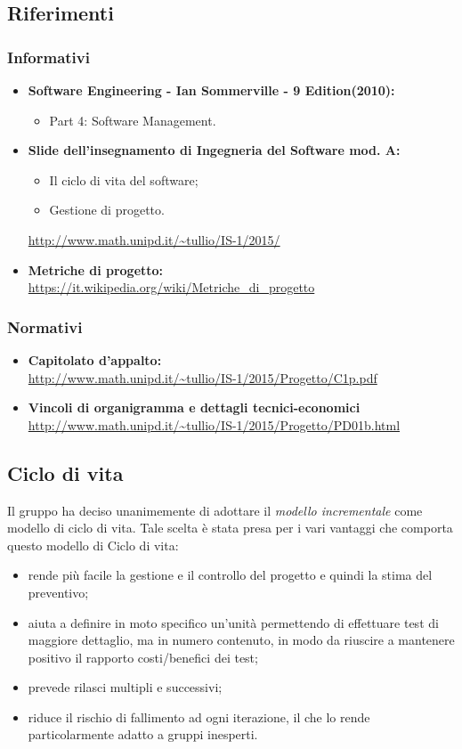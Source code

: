 \documentclass[a4paper]{article}
\begin{document}
		\subsection{Riferimenti}
			\subsubsection{Informativi}
				\begin{itemize}
					\item \textbf{Software Engineering - Ian Sommerville - 9 Edition(2010):}
					\begin{itemize}
						\item Part 4: Software Management.
					\end{itemize}
					\item \textbf{Slide dell'insegnamento di Ingegneria del Software mod. A:}
					\begin{itemize}
						\item Il ciclo di vita del software;
						\item Gestione di progetto.
					\end{itemize}
					\url{http://www.math.unipd.it/~tullio/IS-1/2015/}
					\item \textbf{Metriche di progetto:} \\
					\url{https://it.wikipedia.org/wiki/Metriche_di_progetto}
				\end{itemize}
			\subsubsection{Normativi}
				\begin{itemize}
					\item \textbf{Capitolato d'appalto: } \\ \url{http://www.math.unipd.it/~tullio/IS-1/2015/Progetto/C1p.pdf}
					\item \textbf{Vincoli di organigramma e dettagli tecnici-economici} \\ 
					\url{http://www.math.unipd.it/~tullio/IS-1/2015/Progetto/PD01b.html}
				\end{itemize}
		\subsection{Ciclo di vita}
			Il gruppo ha deciso unanimemente di adottare il \emph{modello incrementale} come modello di ciclo di vita.
			Tale scelta è stata presa per i vari vantaggi che comporta questo modello di Ciclo di vita:
			\begin{itemize}
				\item rende più facile la gestione e il controllo del progetto e quindi la stima del preventivo;
				\item aiuta a definire in moto specifico un'unità permettendo di effettuare test di maggiore dettaglio, ma 
				in numero contenuto, in modo da riuscire a mantenere positivo il rapporto costi/benefici dei test;
				\item prevede rilasci multipli e successivi;
				\item riduce il rischio di fallimento ad ogni iterazione, il che lo rende particolarmente adatto a gruppi 
				inesperti.
			\end{itemize}
			
\end{document}
